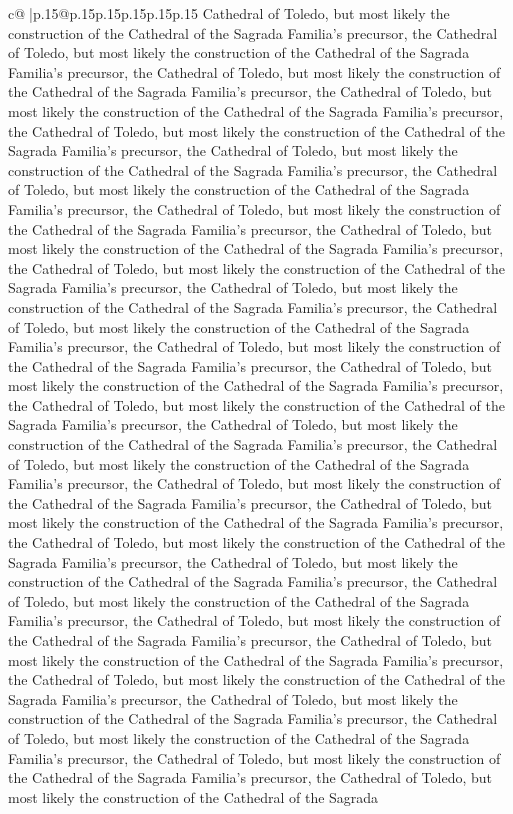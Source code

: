 \documentclass{article}
\begin{document}
{\begin{supertabular}{c@{$\;$}|p{.15\linewidth}@{}p{.15\linewidth}p{.15\linewidth}p{.15\linewidth}p{.15\linewidth}p{.15\linewidth}}
{{{Cathedral of Toledo, but most likely the construction of the Cathedral of the Sagrada Familia's precursor, the Cathedral of Toledo, but most likely the construction of the Cathedral of the Sagrada Familia's precursor, the Cathedral of Toledo, but most likely the construction of the Cathedral of the Sagrada Familia's precursor, the Cathedral of Toledo, but most likely the construction of the Cathedral of the Sagrada Familia's precursor, the Cathedral of Toledo, but most likely the construction of the Cathedral of the Sagrada Familia's precursor, the Cathedral of Toledo, but most likely the construction of the Cathedral of the Sagrada Familia's precursor, the Cathedral of Toledo, but most likely the construction of the Cathedral of the Sagrada Familia's precursor, the Cathedral of Toledo, but most likely the construction of the Cathedral of the Sagrada Familia's precursor, the Cathedral of Toledo, but most likely the construction of the Cathedral of the Sagrada Familia's precursor, the Cathedral of Toledo, but most likely the construction of the Cathedral of the Sagrada Familia's precursor, the Cathedral of Toledo, but most likely the construction of the Cathedral of the Sagrada Familia's precursor, the Cathedral of Toledo, but most likely the construction of the Cathedral of the Sagrada Familia's precursor, the Cathedral of Toledo, but most likely the construction of the Cathedral of the Sagrada Familia's precursor, the Cathedral of Toledo, but most likely the construction of the Cathedral of the Sagrada Familia's precursor, the Cathedral of Toledo, but most likely the construction of the Cathedral of the Sagrada Familia's precursor, the Cathedral of Toledo, but most likely the construction of the Cathedral of the Sagrada Familia's precursor, the Cathedral of Toledo, but most likely the construction of the Cathedral of the Sagrada Familia's precursor, the Cathedral of Toledo, but most likely the construction of the Cathedral of the Sagrada Familia's precursor, the Cathedral of Toledo, but most likely the construction of the Cathedral of the Sagrada Familia's precursor, the Cathedral of Toledo, but most likely the construction of the Cathedral of the Sagrada Familia's precursor, the Cathedral of Toledo, but most likely the construction of the Cathedral of the Sagrada Familia's precursor, the Cathedral of Toledo, but most likely the construction of the Cathedral of the Sagrada Familia's precursor, the Cathedral of Toledo, but most likely the construction of the Cathedral of the Sagrada Familia's precursor, the Cathedral of Toledo, but most likely the construction of the Cathedral of the Sagrada Familia's precursor, the Cathedral of Toledo, but most likely the construction of the Cathedral of the Sagrada Familia's precursor, the Cathedral of Toledo, but most likely the construction of the Cathedral of the Sagrada Familia's precursor, the Cathedral of Toledo, but most likely the construction of the Cathedral of the Sagrada Familia's precursor, the Cathedral of Toledo, but most likely the construction of the Cathedral of the Sagrada Familia's precursor, the Cathedral of Toledo, but most likely the construction of the Cathedral of the Sagrada }}}
\end{supertabular}}
\end{document}

